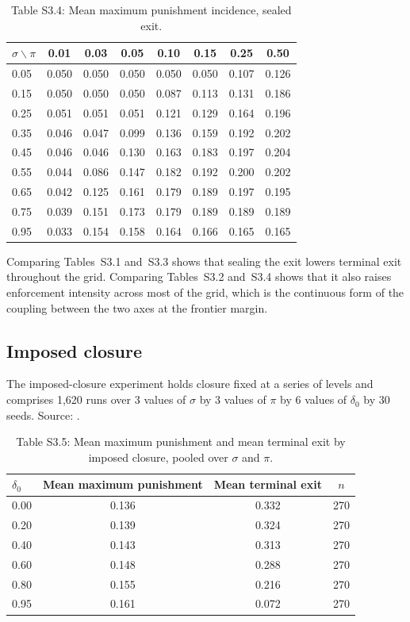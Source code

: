 \documentclass[12pt]{article}
\begin{document}
\begin{table}[htbp]
\centering
\small
\caption{Table S3.4: Mean maximum punishment incidence, sealed exit.}
\begin{tabular}{lccccccc}
\toprule
$\sigma \backslash \pi$ & 0.01 & 0.03 & 0.05 & 0.10 & 0.15 & 0.25 & 0.50 \\
\midrule
0.05 & 0.050 & 0.050 & 0.050 & 0.050 & 0.050 & 0.107 & 0.126 \\
0.15 & 0.050 & 0.050 & 0.050 & 0.087 & 0.113 & 0.131 & 0.186 \\
0.25 & 0.051 & 0.051 & 0.051 & 0.121 & 0.129 & 0.164 & 0.196 \\
0.35 & 0.046 & 0.047 & 0.099 & 0.136 & 0.159 & 0.192 & 0.202 \\
0.45 & 0.046 & 0.046 & 0.130 & 0.163 & 0.183 & 0.197 & 0.204 \\
0.55 & 0.044 & 0.086 & 0.147 & 0.182 & 0.192 & 0.200 & 0.202 \\
0.65 & 0.042 & 0.125 & 0.161 & 0.179 & 0.189 & 0.197 & 0.195 \\
0.75 & 0.039 & 0.151 & 0.173 & 0.179 & 0.189 & 0.189 & 0.189 \\
0.95 & 0.033 & 0.154 & 0.158 & 0.164 & 0.166 & 0.165 & 0.165 \\
\bottomrule
\end{tabular}
\end{table}

Comparing Tables~S3.1 and~S3.3 shows that sealing the exit lowers terminal exit
throughout the grid. Comparing Tables~S3.2 and~S3.4 shows that it also raises
enforcement intensity across most of the grid, which is the continuous form of
the coupling between the two axes at the frontier margin.

\subsection{Imposed closure}

The imposed-closure experiment holds closure fixed at a series of levels and
comprises 1,620 runs over 3 values of $\sigma$ by 3 values of $\pi$ by 6 values
of $\delta_0$ by 30 seeds. Source:
.

\begin{table}[htbp]
\centering
\small
\caption{Table S3.5: Mean maximum punishment and mean terminal exit by imposed closure, pooled over $\sigma$ and $\pi$.}
\begin{tabular}{lccc}
\toprule
$\delta_0$ & Mean maximum punishment & Mean terminal exit & $n$ \\
\midrule
0.00 & 0.136 & 0.332 & 270 \\
0.20 & 0.139 & 0.324 & 270 \\
0.40 & 0.143 & 0.313 & 270 \\
0.60 & 0.148 & 0.288 & 270 \\
0.80 & 0.155 & 0.216 & 270 \\
0.95 & 0.161 & 0.072 & 270 \\
\bottomrule
\end{tabular}
\end{table}
\end{document}
